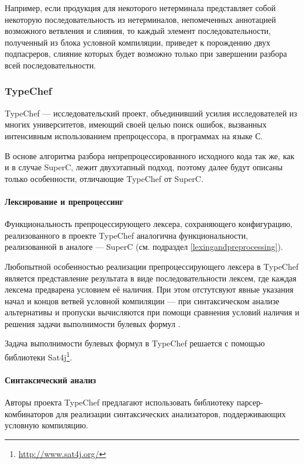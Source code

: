 Например, если продукция для некоторого нетерминала представляет собой некоторую последовательность из нетерминалов, непомеченных аннотацией возможного ветвления и слияния, то каждый элемент последовательности, полученный из блока условной компиляции, приведет к порождению двух подпасреров, слияние которых будет возможно только при завершении разбора всей последовательности. 

\subsubsection{TypeChef}

TypeChef --- исследовательский проект, объединивший усилия исследователей из многих университетов, имеющий своей целью поиск ошибок, вызванных интенсивным использованием препроцессора, в программах на языке С.

В основе алгоритма разбора непрепроцессированного исходного кода так же, как и в случае SuperC, лежит двухэтапный подход, поэтому далее будут описаны только особенности, отличающие TypeChef от SuperC.

\paragraph{Лексирование и препроцессинг}

Функциональность препроцессирующего лексера, сохраняющего конфигурацию, реализованного в проекте TypeChef аналогична функциональности, реализованной в аналоге --- SuperC (см. подраздел \ref{lexingandpreprocessing}).

Любопытной особенностью реализации препроцессирующего лексера в TypeChef является представление результата в виде последовательности лексем, где каждая лексема предварена условием её наличия. При этом отстутсвуют явные указания начал и концов ветвей условной компиляции --- при синтаксическом анализе альтернативы и пропуски вычисляются при помощи сравнения условий наличия и решения задачи выполнимости булевых формул \cite{garey}.

Задача выполнимости булевых формул в TypeChef решается с помощью библиотеки Sat4j\footnote{\url{http://www.sat4j.org/}}.

\paragraph{Синтаксический анализ}

Авторы проекта TypeChef предлагают использовать библиотеку парсер-комбинаторов для реализации синтаксических анализаторов, поддерживающих условную компиляцию.

